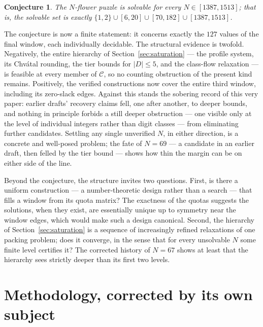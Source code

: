 \documentclass[11pt]{article}
\newtheorem{conjecture}{Conjecture}
\theoremstyle{definition}
\theoremstyle{remark}
\begin{document}
\begin{conjecture}\label{conj:main}
The $N$-flower puzzle is solvable for every $N\in[1387,1513]$; that is, the solvable set is exactly
$\{1,2\}\cup[6,20]\cup[70,182]\cup[1387,1513]$.
\end{conjecture}

The conjecture is now a finite statement: it concerns exactly the $127$ values of the final window, each individually decidable. The structural evidence is twofold. Negatively, the entire hierarchy of Section~\ref{sec:saturation} --- the profile system, its Chv\'atal rounding, the tier bounds for $|D|\le 5$, and the class-flow relaxation --- is feasible at every member of $\mathcal{C}$, so no counting obstruction of the present kind remains. Positively, the verified constructions now cover the entire third window, including its zero-slack edges. Against this stands the sobering record of this very paper: earlier drafts' recovery claims fell, one after another, to deeper bounds, and nothing in principle forbids a still deeper obstruction --- one visible only at the level of individual integers rather than digit classes --- from eliminating further candidates. Settling any single unverified $N$, in either direction, is a concrete and well-posed problem; the fate of $N=69$ --- a candidate in an earlier draft, then felled by the tier bound --- shows how thin the margin can be on either side of the line.

Beyond the conjecture, the structure invites two questions. First, is there a uniform construction --- a number-theoretic design rather than a search --- that fills a window from its quota matrix? The exactness of the quotas suggests the solutions, when they exist, are essentially unique up to symmetry near the window edges, which would make such a design canonical. Second, the hierarchy of Section~\ref{sec:saturation} is a sequence of increasingly refined relaxations of one packing problem; does it converge, in the sense that for every unsolvable $N$ some finite level certifies it? The corrected history of $N=67$ shows at least that the hierarchy sees strictly deeper than its first two levels.

\section{Methodology, corrected by its own subject}\label{sec:method}
\end{document}
